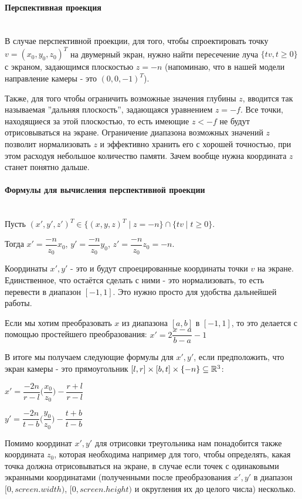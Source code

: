 \documentclass{article}
\begin{document}
\paragraph{Перспективная проекция}
$\text{}$\\
В случае перспективной проекции, для того, чтобы спроектировать точку \\ $v=(x_0, y_0, z_0)^T$ на двумерный экран, нужно найти пересечение луча $\{tv, t\geq 0\}$ с экраном, задающимся плоскостью $z=-n$ (напоминаю, что в нашей модели направление камеры - это $(0, 0, -1)^T$). 

Также, для того чтобы ограничить возможные значения глубины $z$, вводится так называемая ''дальняя плоскость'', задающаяся уравнением $z=-f$. Все точки, находящиеся за этой плоскостью, то есть имеющие $z<-f$ не будут отрисовываться на экране. Ограничение диапазона возможных значений $z$ позволит нормализовать $z$ и эффективно хранить его с хорошей точностью, при этом расходуя небольшое количество памяти. Зачем вообще нужна координата $z$ станет понятно дальше.

\paragraph{Формулы для вычисления перспективной проекции}
$\text{}$\\
Пусть $(x', y', z')^T \in \{(x, y, z)^T \mid z = -n\} \cap \{tv \mid t\geq 0\}$.

Тогда $x'=\dfrac{-n}{z_0}x_0$, $y'=\dfrac{-n}{z_0}y_0$, $z'=\dfrac{-n}{z_0}z_0=-n$.

Координаты $x', y'$ - это и будут спроецированные координаты точки $v$ на экране. Единственное, что остаётся сделать с ними - это нормализовать, то есть перевести в диапазон $[-1, 1]$. Это нужно просто для удобства дальнейшей работы.

Если мы хотим преобразовать $x$ из диапазона $[a, b]$ в $[-1, 1]$, то это делается с помощью простейшего преобразования: $x'=2\dfrac{x-a}{b-a}-1$

В итоге мы получаем следующие формулы для $x', y'$, если предположить, что экран камеры - это прямоугольник $[l, r]\times[b, t]\times\{-n\} \subseteq \mathbb{R}^3$:

$x'=\dfrac{-2n}{r - l}\big(\dfrac{x_0}{z_0}\big)-\dfrac{r+l}{r-l}$

$y'=\dfrac{-2n}{t - b}\big(\dfrac{y_0}{z_0}\big)-\dfrac{t+b}{t-b}$

Помимо координат $x', y'$ для отрисовки треугольника нам понадобится также координата $z_0$, которая необходима например для того, чтобы определять, какая точка должна отрисовываться на экране, в случае если точек с одинаковыми экранными координатами (полученными после преобразования $x', y'$ в диапазон $[0, screen.width)$, $[0, screen.height)$ и округления их до целого числа) несколько.
\end{document}

